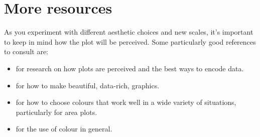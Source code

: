 \section{More resources}
\label{sec:scale-resources}

As you experiment with different aesthetic choices and new scales, it's important to keep in mind how the plot will be perceived.   Some particularly good references to consult are:

\begin{itemize}
  \item \citet{cleveland:1993,cleveland:1987,cleveland:1994} for research on how plots are perceived and the best ways to encode data.
  \item \citet{tufte:2006,tufte:1990,tufte:1997,tufte:2001} for how to make beautiful, data-rich, graphics.
  \item \citet{brewer:1994,brewer:1994a} for how to choose colours that work well in a wide variety of situations, particularly for area plots.
  \item \citet{carr:1999,carr:1994,carr:2002} for the use of colour in general.
\end{itemize}



